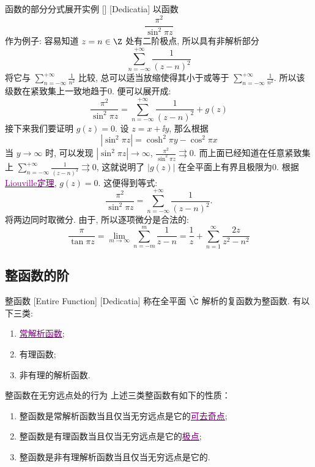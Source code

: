 \documentclass[UTF8]{ctexart}
\newcommand{\hyperrefc}[2]{\hyperref[#1]{\textcolor{purple}{#2}}}
\begin{document}
        \begin{xmp}
            [64]
            {函数的部分分式展开实例}
            []
            [Dedicatia]
            以函数
            \[\frac{\pi^2}{\sin^2\pi z}\]
            作为例子: 容易知道 \(z=n\in\Z\) 处有二阶极点, 所以具有非解析部分
            \[\sum_{n=-\infty}^{+\infty}\frac{1}{(z-n)^2}\]
            将它与 \(\sum\limits_{n=-\infty}^{+\infty}\frac{1}{n^2}\) 比较, 总可以适当放缩使得其小于或等于 \(\sum\limits_{n=-\infty}^{+\infty}\frac{1}{n^2}\). 所以该级数在紧致集上一致地趋于0. 便可以展开成: 
            \[\frac{\pi^2}{\sin^2\pi z}=\sum_{n=-\infty}^{+\infty}\frac{1}{(z-n)^2}+g(z)\]
            接下来我们要证明 \(g(z)=0\). 设 \(z=x+\ii y\), 那么根据
            \[|\sin^2\pi z|=\cosh^2\pi y-\cos^2\pi x\]
            当 \(y\to\infty\) 时, 可以发现 \(|\sin^2\pi z|\to\infty\),  \(\frac{\pi^2}{\sin^2\pi z}\rightrightarrows 0\). 而上面已经知道在任意紧致集上 \(\sum_{n=-\infty}^{+\infty}\frac{1}{(z-n)^2}\rightrightarrows 0\), 这就说明了 \(|g(z)|\) 在全平面上有界且极限为0. 根据\hyperrefc{thm:Liouville}{Liouville定理},  \(g(z)=0\). 这便得到等式: 
            \[\frac{\pi^2}{\sin^2\pi z}=\sum_{n=-\infty}^{+\infty}\frac{1}{(z-n)^2}.\]
            将两边同时取微分. 由于, 所以逐项微分是合法的: 
            \[\frac{\pi}{\tan\pi z}=\lim_{m\to\infty}\sum_{n=-m}^{m}\frac{1}{z-n}=\frac{1}{z}+\sum_{n=1}^{\infty}\frac{2z}{z^2-n^2}\]
        \end{xmp}
    
    \subsection{整函数的阶}

        \begin{dfn}
            [EntireFunction]
            {整函数}
            [Entire Function]
            [Dedicatia]
            称在全平面 \(\hat{\C}\) 解析的复函数为整函数. 有以下三类: 
            \begin{enumerate}
                \item \hyperrefc{ppt:TrivialAnalyticalFunction}{常解析函数}; 
                \item 有理函数; 
                \item 非有理的解析函数. 
            \end{enumerate}
        \end{dfn}

        \begin{ppt}
            {整函数在无穷远点处的行为}
            上述三类整函数有如下的性质：
            \begin{enumerate}
                \item 整函数是常解析函数当且仅当无穷远点是它的\hyperrefc{dfn:RemovableSingularity}{可去奇点};
                \item 整函数是有理函数当且仅当无穷远点是它的\hyperrefc{dfn:PolarSingularity}{极点};
                \item 整函数是非有理解析函数当且仅当无穷远点是它的\EssentialSingularity.
            \end{enumerate}
        \end{ppt}
    
\end{document}
